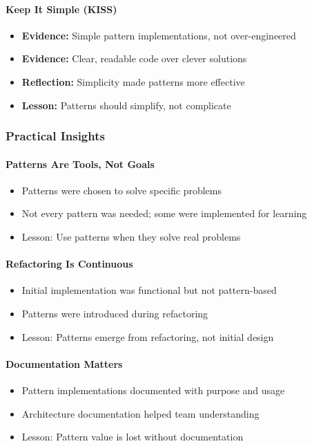 \documentclass[11pt, a4paper]{article}
\theoremstyle{plain}
\theoremstyle{definition}
\begin{document}
\paragraph{Keep It Simple (KISS)}
\begin{itemize}
    \item \textbf{Evidence:} Simple pattern implementations, not over-engineered
    \item \textbf{Evidence:} Clear, readable code over clever solutions
    \item \textbf{Reflection:} Simplicity made patterns more effective
    \item \textbf{Lesson:} Patterns should simplify, not complicate
\end{itemize}

\subsubsection{Practical Insights}

\paragraph{Patterns Are Tools, Not Goals}
\begin{itemize}
    \item Patterns were chosen to solve specific problems
    \item Not every pattern was needed; some were implemented for learning
    \item Lesson: Use patterns when they solve real problems
\end{itemize}

\paragraph{Refactoring Is Continuous}
\begin{itemize}
    \item Initial implementation was functional but not pattern-based
    \item Patterns were introduced during refactoring
    \item Lesson: Patterns emerge from refactoring, not initial design
\end{itemize}

\paragraph{Documentation Matters}
\begin{itemize}
    \item Pattern implementations documented with purpose and usage
    \item Architecture documentation helped team understanding
    \item Lesson: Pattern value is lost without documentation
\end{itemize}
\end{document}
